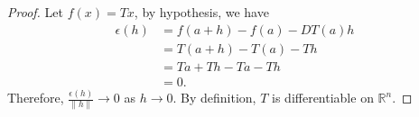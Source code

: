 \begin{Exercise}
\begin{proof}
Let $f(x) = Tx$, by hypothesis, we have
\begin{align*}
\epsilon(h)
&= f(a+h) - f(a) - D T(a)h \\
&= T(a+h) - T(a) - Th \\
&= Ta + Th - Ta - Th \\
&= 0.
\end{align*}
Therefore, $\frac{\epsilon(h)}{\| h \|}\to 0$ as $h\to 0$.
By definition, $T$ is differentiable on $\mathbb{R}^n$.
\end{proof}
\end{Exercise}